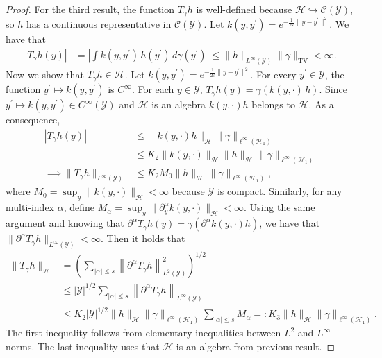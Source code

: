 \documentclass{article}
\theoremstyle{plain}
\theoremstyle{definition}
\theoremstyle{remark}
\newcommand{\of}[1]{\left(#1\right)}
\newcommand{\abs}[1]{\left|#1\right|}
\newcommand{\cH}{\mathcal{H}}
\newcommand{\cC}{\mathcal{C}}
\newcommand{\cY}{\mathcal{Y}}
\newcommand{\1}{\mathbbm{1}}
\newcommand{\TV}{\text{TV}}
\newcommand{\eps}{\varepsilon}
\newcommand{\norm}[1]{\left \| #1 \right \|}
\theoremstyle{plain}
\theoremstyle{definition}
\begin{document}
\begin{proof}
    For the third result, the function $T_\gamma h$ is well-defined because $\cH \hookrightarrow \cC(\cY)$, so $h$ has a continuous representative in $\cC(\cY)$. Let $k(y, y^\prime) = e^{-\frac{1}{2\eps} \|y - y^\prime\|^2}$. We have that 
    \begin{align*}
        \abs{T_\gamma h(y)} &= \abs{\int k(y, y^\prime) \, h(y^\prime) \, d\gamma(y^\prime)} \leq \| h\|_{L^\infty(\cY)} \|\gamma\|_{\TV} < \infty.
    \end{align*}
    Now we show that $T_\gamma h \in \cH$. Let $k(y, y^\prime) = e^{-\frac{1}{2\eps} \|y - y^\prime\|^2}$. For every $y^\prime \in \cY$, the function $y^\prime \mapsto k(y, y^\prime)$ is $C^\infty$. For each $y \in \cY$, $T_\gamma h(y) = \gamma \of{k(y, \cdot) \, h}$. Since $y^\prime \mapsto k(y, y^\prime) \in C^\infty(\cY)$ and $\cH$ is an algebra $k(y, \cdot) h $ belongs to $\cH$. As a consequence,
    \begin{align*}
        \abs{T_\gamma h (y)} &\leq \| k(y, \cdot) h \|_{\cH} \|\gamma\|_{\ell^\infty(\cH_1)}\\
        &\leq K_2 \| k(y, \cdot) \|_\cH \|h\|_\cH \, \|\gamma\|_{\ell^\infty(\cH_1)}\\
        \implies \| T_\gamma h\|_{L^\infty(\cY)} &\leq K_2 M_0 \|h\|_\cH \, \|\gamma\|_{\ell^\infty(\cH_1)},
    \end{align*}
    where $M_0 = \sup_{y} \| k(y, \cdot) \|_\cH < \infty$ because $\cY $ is compact. Similarly, for any multi-index $\alpha$, define $M_\alpha = \sup_{y} \|\partial^\alpha_y k(y, \cdot) \|_\cH < \infty$. Using the same argument and knowing that ${\partial^\alpha T_\gamma h (y)} = {\gamma (\partial^\alpha k(y, \cdot) h)}$, we have that $\|\partial^\alpha T_\gamma h\|_{L^\infty(\cY)} < \infty$. Then it holds that
    \begin{align*}
        \| T_\gamma h \|_\cH &= \of{\sum_{\abs{\alpha} \leq s} \norm{\partial^\alpha T_\gamma h}_{L^2(\cY)}^2}^{1/2}\\
        &\leq \abs{\cY}^{1/2} \sum_{\abs{\alpha} \leq s} \norm{\partial^\alpha T_\gamma h}_{L^\infty(\cY)}\\
        &\leq K_2 \abs{\cY}^{1/2}  \|h\|_\cH \|\gamma \|_{\ell^\infty(\cH_1)} \sum_{\abs{\alpha} \leq s} M_\alpha =: K_3 \|h\|_\cH \|\gamma \|_{\ell^\infty(\cH_1)}.
    \end{align*}
    The first inequality follows from elementary inequalities between $L^2$ and $L^\infty$ norms. The last inequality uses that $\cH$ is an algebra from previous result.
\end{proof}
\end{document}
